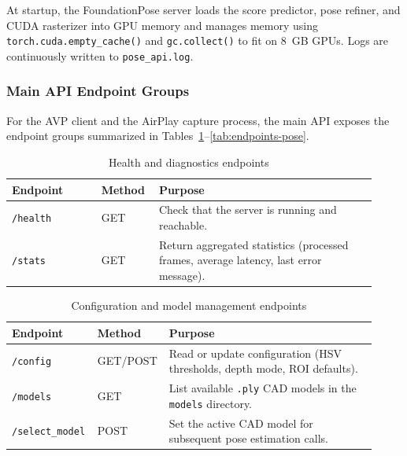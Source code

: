At startup, the FoundationPose server loads the score predictor, pose refiner, and CUDA rasterizer into GPU memory and manages memory using \texttt{torch.cuda.empty\_cache()} and \texttt{gc.collect()} to fit on 8~GB GPUs. Logs are continuously written to \texttt{pose\_api.log}.

\subsubsection{Main API Endpoint Groups}

For the AVP client and the AirPlay capture process, the main API exposes the endpoint groups summarized in Tables~\ref{tab:endpoints-health}–\ref{tab:endpoints-pose}.

\begin{table}[H]
    \centering
    \caption{Health and diagnostics endpoints}
    \label{tab:endpoints-health}
    \begin{tabular}{p{0.23\linewidth}p{0.13\linewidth}p{0.56\linewidth}}
        \toprule
        \textbf{Endpoint} & \textbf{Method} & \textbf{Purpose} \\
        \midrule
        \texttt{/health} & GET &
        Check that the server is running and reachable. \\
        \texttt{/stats} & GET &
        Return aggregated statistics (processed frames, average latency, last error message). \\
        \bottomrule
    \end{tabular}
\end{table}

\begin{table}[H]
    \centering
    \caption{Configuration and model management endpoints}
    \label{tab:endpoints-config}
    \begin{tabular}{p{0.23\linewidth}p{0.13\linewidth}p{0.56\linewidth}}
        \toprule
        \textbf{Endpoint} & \textbf{Method} & \textbf{Purpose} \\
        \midrule
        \texttt{/config} &
        GET/POST &
        Read or update configuration (HSV thresholds, depth mode, ROI defaults). \\
        \texttt{/models} & GET &
        List available \texttt{.ply} CAD models in the \texttt{models} directory. \\
        \texttt{/select\_model} & POST &
        Set the active CAD model for subsequent pose estimation calls. \\
        \bottomrule
    \end{tabular}
\end{table}

